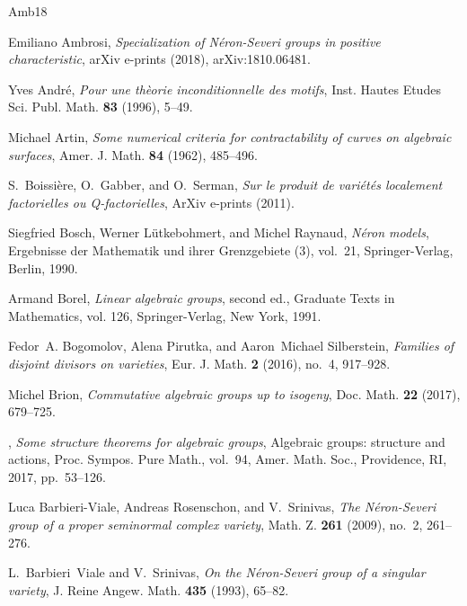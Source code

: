 \documentclass{amsart}
\theoremstyle{definition}
\theoremstyle{remark}
\begin{document}
\begin{thebibliography}{{Amb}18}

Emiliano {Ambrosi}, \emph{{Specialization of N{\'e}ron-Severi groups in
  positive characteristic}}, arXiv e-prints (2018), arXiv:1810.06481.

Yves Andr\'e, \emph{Pour une th{\`e}orie inconditionnelle des motifs}, Inst.
  Hautes Etudes Sci. Publ. Math. \textbf{83} (1996), 5--49.

Michael Artin, \emph{Some numerical criteria for contractability of curves on
  algebraic surfaces}, Amer. J. Math. \textbf{84} (1962), 485--496.

S.~{Boissi{\`e}re}, O.~{Gabber}, and O.~{Serman}, \emph{{Sur le produit de
  {vari\'et\'es} localement factorielles ou Q-factorielles}}, ArXiv e-prints
  (2011).

Siegfried Bosch, Werner L{\"u}tkebohmert, and Michel Raynaud, \emph{N\'eron
  models}, Ergebnisse der Mathematik und ihrer Grenzgebiete (3), vol.~21,
  Springer-Verlag, Berlin, 1990. 

Armand Borel, \emph{Linear algebraic groups}, second ed., Graduate Texts in
  Mathematics, vol. 126, Springer-Verlag, New York, 1991. 

Fedor~A. Bogomolov, Alena Pirutka, and Aaron~Michael Silberstein,
  \emph{Families of disjoint divisors on varieties}, Eur. J. Math. \textbf{2}
  (2016), no.~4, 917--928. 

Michel Brion, \emph{Commutative algebraic groups up to isogeny}, Doc. Math.
  \textbf{22} (2017), 679--725. 

\bysame, \emph{Some structure theorems for algebraic groups}, Algebraic groups:
  structure and actions, Proc. Sympos. Pure Math., vol.~94, Amer. Math. Soc.,
  Providence, RI, 2017, pp.~53--126. 

Luca Barbieri-Viale, Andreas Rosenschon, and V.~Srinivas, \emph{The
  {N}\'eron-{S}everi group of a proper seminormal complex variety}, Math. Z.
  \textbf{261} (2009), no.~2, 261--276. 

L.~Barbieri~Viale and V.~Srinivas, \emph{On the {N}\'eron-{S}everi group of a
  singular variety}, J. Reine Angew. Math. \textbf{435} (1993), 65--82.


\end{thebibliography}
\end{document}
